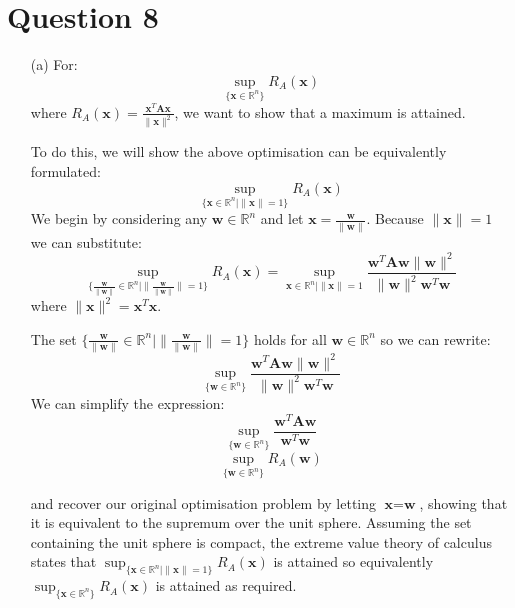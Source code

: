 \documentclass[12pt]{article}
\begin{document}
\newpage
\section*{Question 8}
\begin{enumerate}
\item[(a)] For:
$$\sup_{\{\textbf{x}\in \mathbb{R}^n\}} R_A(\textbf{x})$$
where $R_A(\textbf{x}) = \frac{\textbf{x}^T\textbf{Ax}}{\|\textbf{x}\|^2}$, we want to show that a maximum is attained.

To do this, we will show the above optimisation can be equivalently formulated:
$$\sup_{\{\textbf{x}\in \mathbb{R}^n | \| \textbf{x}\|=1\}} R_A(\textbf{x})$$
We begin by considering any $\textbf{w} \in \mathbb{R}^n$ and let $\textbf{x} = \frac{\textbf{w}}{\|\textbf{w}\|}$. Because $\|\textbf{x}\| = 1$ we can substitute:
$$\sup_{\{\frac{\textbf{w}}{\|\textbf{w}\|}\in \mathbb{R}^n | \| \frac{\textbf{w}}{\|\textbf{w}\|}\|=1\}} R_A(\textbf{x}) = \sup_{\textbf{x}\in \mathbb{R}^n | \| \textbf{x}\|=1} \frac{\textbf{w}^T\textbf{Aw} \|\textbf{w}\|^2}{\|\textbf{w}\|^2 \textbf{w}^T\textbf{w}}$$
where $\|\textbf{x}\|^2 = \textbf{x}^T\textbf{x}$.

The set $\{\frac{\textbf{w}}{\|\textbf{w}\|}\in \mathbb{R}^n | \| \frac{\textbf{w}}{\|\textbf{w}\|}\|=1\}$ holds for all $\textbf{w} \in \mathbb{R}^n$ so we can rewrite:
$$\sup_{\{\textbf{w}\in \mathbb{R}^n\}} \frac{\textbf{w}^T\textbf{Aw} \|\textbf{w}\|^2}{\|\textbf{w}\|^2 \textbf{w}^T\textbf{w}}$$
We can simplify the expression:
$$\sup_{\{\textbf{w}\in \mathbb{R}^n\}} \frac{\textbf{w}^T\textbf{Aw} }{\textbf{w}^T\textbf{w}}$$
$$\sup_{\{\textbf{w}\in \mathbb{R}^n\}} R_A(\textbf{w})$$

and recover our original optimisation problem by letting $\textbf{x}=\textbf{w}$, showing that it is equivalent to the supremum over the unit sphere. Assuming the set containing the unit sphere is compact, the extreme value theory of calculus states that $\sup_{\{\textbf{x}\in \mathbb{R}^n | \| \textbf{x}\|=1\}} R_A(\textbf{x})$ is attained so equivalently $\sup_{\{\textbf{x}\in \mathbb{R}^n\}} R_A(\textbf{x})$ is attained as required.


\end{enumerate}
\end{document}
